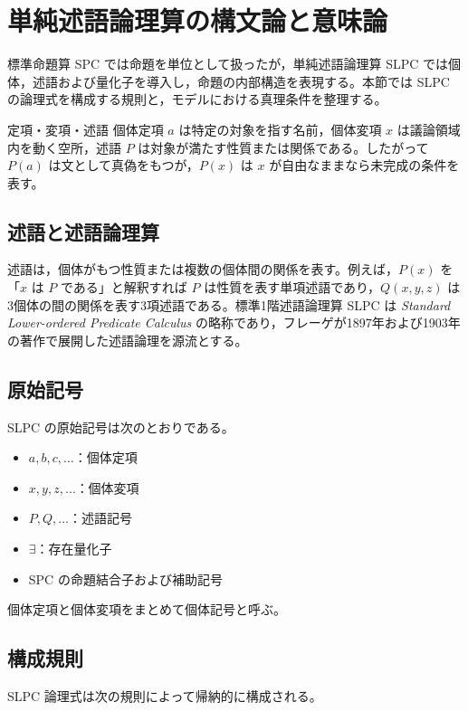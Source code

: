 \documentclass[../main.tex]{subfiles}
\begin{document}
\section{単純述語論理算の構文論と意味論}

標準命題算 SPC では命題を単位として扱ったが，単純述語論理算 SLPC では個体，述語および量化子を導入し，命題の内部構造を表現する。本節では SLPC の論理式を構成する規則と，モデルにおける真理条件を整理する。

\begin{sidebox}[TBred]{定項・変項・述語}
  個体定項 \(a\) は特定の対象を指す名前，個体変項 \(x\) は議論領域内を動く空所，述語 \(P\) は対象が満たす性質または関係である。したがって \(P(a)\) は文として真偽をもつが，\(P(x)\) は \(x\) が自由なままなら未完成の条件を表す。
\end{sidebox}

\subsection{述語と述語論理算}

述語は，個体がもつ性質または複数の個体間の関係を表す。例えば，\(P(x)\) を「\(x\) は \(P\) である」と解釈すれば \(P\) は性質を表す単項述語であり，\(Q(x,y,z)\) は3個体の間の関係を表す3項述語である。標準1階述語論理算 SLPC は \emph{Standard Lower-ordered Predicate Calculus} の略称であり，フレーゲが1897年および1903年の著作で展開した述語論理を源流とする。

\subsection{原始記号}

SLPC の原始記号は次のとおりである。
\begin{itemize}
  \item \(a,b,c,\ldots\)：個体定項
  \item \(x,y,z,\ldots\)：個体変項
  \item \(P,Q,\ldots\)：述語記号
  \item \(\exists\)：存在量化子
  \item SPC の命題結合子および補助記号
\end{itemize}
個体定項と個体変項をまとめて個体記号と呼ぶ。

\subsection{構成規則}

SLPC 論理式は次の規則によって帰納的に構成される。
\end{document}
